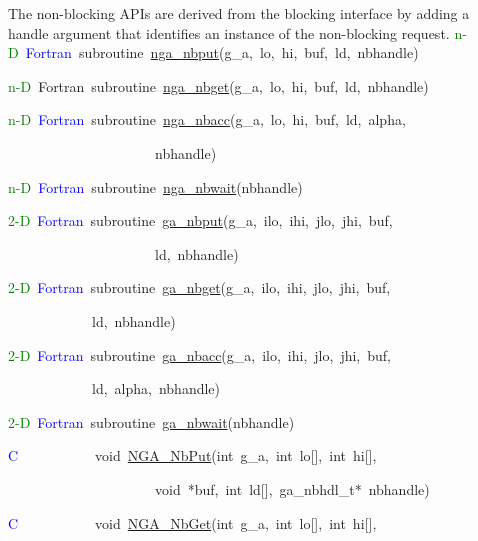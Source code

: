 The non-blocking APIs are derived from the blocking interface by adding
a handle argument that identifies an instance of the non-blocking
request.
\textcolor{green}{n-D}~\textcolor{blue}{Fortran}~subroutine~\href{http://www.emsl.pnl.gov/docs/global/ga_ops.html\#nga_nbput}{nga\_{}nbput}(g\_a,~lo,~hi,~buf,~ld,~nbhandle)~

\textcolor{green}{n-D}~Fortran~subroutine~\href{http://www.emsl.pnl.gov/docs/global/ga_ops.html\#nga_nbget}{nga\_{}nbget}(g\_a,~lo,~hi,~buf,~ld,~nbhandle)~

\textcolor{green}{n-D}~\textcolor{blue}{Fortran}~subroutine~\href{http://www.emsl.pnl.gov/docs/global/ga_ops.html\#nga_nbacc}{nga\_{}nbacc}(g\_a,~lo,~hi,~buf,~ld,~alpha,~

~~~~~~~~~~~~~~~~~~~~~nbhandle)~

\textcolor{green}{n-D}~\textcolor{blue}{Fortran}~subroutine~\href{http://www.emsl.pnl.gov/docs/global/ga_ops.html\#nga_nbwait}{nga\_{}nbwait}(nbhandle)

\textcolor{green}{2-D}~\textcolor{blue}{Fortran}~subroutine~\href{http://www.emsl.pnl.gov/docs/global/ga_ops.html\#ga_nbput}{ga\_{}nbput}(g\_a,~ilo,~ihi,~jlo,~jhi,~buf,

~~~~~~~~~~~~~~~~~~~~~ld,~nbhandle)~

\textcolor{green}{2-D}~\textcolor{blue}{Fortran}~subroutine~\href{http://www.emsl.pnl.gov/docs/global/ga_ops.html\#ga_nbget}{ga\_{}nbget}(g\_a,~ilo,~ihi,~jlo,~jhi,~buf,~

~~~~~~~~~~~~ld,~nbhandle)~

\textcolor{green}{2-D}~\textcolor{blue}{Fortran}~subroutine~\href{http://www.emsl.pnl.gov/docs/global/ga_ops.html\#ga_nbacc}{ga\_{}nbacc}(g\_a,~ilo,~ihi,~jlo,~jhi,~buf,~

~~~~~~~~~~~~ld,~alpha,~nbhandle)~

\textcolor{green}{2-D}~\textcolor{blue}{Fortran}~subroutine~\href{http://www.emsl.pnl.gov/docs/global/ga_ops.html\#ga_nbwait}{ga\_{}nbwait}(nbhandle)

\textcolor{blue}{C}~~~~~~~~~~~void~\href{http://www.emsl.pnl.gov/docs/global/c_nga_ops.html\#ga_nbput}{NGA\_{}NbPut}(int~g\_a,~int~lo{[}{]},~int~hi{[}{]},~

~~~~~~~~~~~~~~~~~~~~~void~{*}buf,~int~ld{[}{]},~ga\_nbhdl\_t{*}~nbhandle)~

\textcolor{blue}{C}~~~~~~~~~~~void~\href{http://www.emsl.pnl.gov/docs/global/c_nga_ops.html\#ga_nbget}{NGA\_{}NbGet}(int~g\_a,~int~lo{[}{]},~int~hi{[}{]},~

